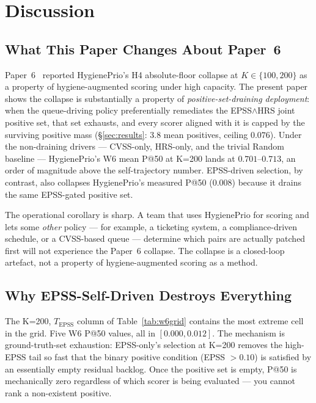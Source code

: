 \section{Discussion}
\label{sec:discussion}

\subsection{What This Paper Changes About Paper~6}

Paper~6~\cite{paper6capacity} reported HygienePrio's H4 absolute-floor
collapse at $K \in \{100, 200\}$ as a property of hygiene-augmented
scoring under high capacity. The present paper shows the collapse is
substantially a property of \textit{positive-set-draining deployment}:
when the queue-driving policy preferentially remediates the
EPSS$\wedge$HRS joint positive set, that set exhausts, and every
scorer aligned with it is capped by the surviving positive mass
(\S\ref{sec:results}: $3.8$ mean positives, ceiling $0.076$).
Under the non-draining drivers --- CVSS-only, HRS-only, and the
trivial Random baseline --- HygienePrio's W6 mean P@50 at K=200 lands
at $0.701$--$0.713$, an order of magnitude above the self-trajectory
number. EPSS-driven selection, by contrast, also collapses
HygienePrio's measured P@50 ($0.008$) because it drains the same
EPSS-gated positive set.

The operational corollary is sharp. A team that uses HygienePrio for
scoring and lets some \textit{other} policy --- for example, a
ticketing system, a compliance-driven schedule, or a CVSS-based
queue --- determine which pairs are actually patched first will not
experience the Paper~6 collapse. The collapse is a closed-loop
artefact, not a property of hygiene-augmented scoring as a method.

\subsection{Why EPSS-Self-Driven Destroys Everything}

The K=200, $T_{\mathrm{EPSS}}$ column of Table~\ref{tab:w6grid} contains
the most extreme cell in the grid. Five W6 P@50 values, all in
$[0.000, 0.012]$. The mechanism is ground-truth-set exhaustion:
EPSS-only's selection at K=200 removes the high-EPSS tail so fast that
the binary positive condition (EPSS $> 0.10$) is satisfied by an
essentially empty residual backlog. Once the positive set is empty,
P@50 is mechanically zero regardless of which scorer is being
evaluated --- you cannot rank a non-existent positive.


